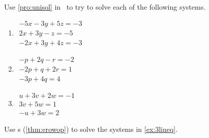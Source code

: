 \begin{exercise} \label{ex:3lineq} 
Use \cref{pro:unisol} in \script\ to try to solve each of the following systems.
\begin{enumerate}
\item \(\begin{array}{l}
-5x  -3y   +5z=  -3 \\
   2x   +3y  -z = -5\\
  -2x   +3y   +4z=  -3
\end{array}\)

\item \(\begin{array}{l}
-p   +2q  -r=  -2\\
  -2p   +q   +2r=   1\\
  -3p   +4q=   4\end{array}\)

\item \(\begin{array}{l}
u   +3v   +2w=  -1\\
      3v   +5w=   1\\
  -u      +3w=   2\end{array}\)


%
\end{enumerate}
\end{exercise}


\begin{exercise}  
Use s (\cref{thm:erowop}) to solve the systems in \cref{ex:3lineq}.
\end{exercise}





